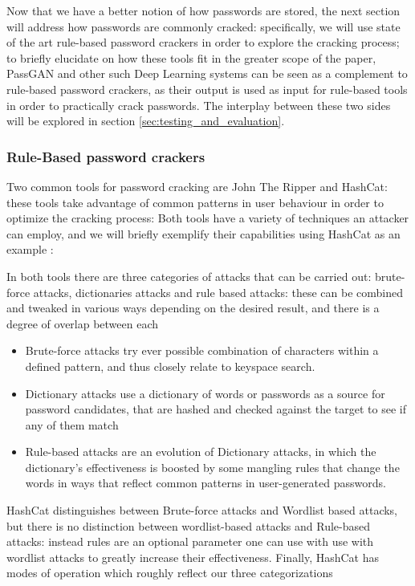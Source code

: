 Now that we have a better notion of how passwords are stored, the next section will address how passwords are commonly cracked: specifically, we will use state of the art rule-based password crackers in order to explore the cracking process; to briefly elucidate on how these tools fit in the greater scope of the paper, PassGAN and other such Deep Learning systems can be seen as a complement to rule-based password crackers, as their output is used as input for rule-based tools in order to practically crack passwords. The interplay between these two sides will be explored in section \ref{sec:testing_and_evaluation}.

\subsubsection{Rule-Based password crackers} \label{hash_and_jtr}

Two common tools for password cracking are John The Ripper and \break \mbox{HashCat}\cite{john,hash_cat}: these tools take advantage of common patterns in user behaviour in order to optimize the cracking process: Both tools have a variety of techniques an attacker can employ, and we will briefly exemplify their capabilities using HashCat as an example \cite{hash_cat_wiki}:

In both tools there are three categories of attacks that can be carried out: brute-force attacks, dictionaries attacks and rule based attacks: these can be combined and tweaked in various ways depending on the desired result, and there is a degree of overlap between each

\begin{itemize}
\item Brute-force attacks try ever possible combination of characters within a defined pattern, and thus closely relate to keyspace search. 
\item Dictionary attacks use a dictionary of words or passwords as a source for password candidates, that are hashed and checked against the target to see if any of them match
\item Rule-based attacks are an evolution of Dictionary attacks, in which the dictionary's effectiveness is boosted by some mangling rules that change the words in ways that reflect common patterns in user-generated passwords.
\end{itemize}

HashCat distinguishes between Brute-force attacks and Wordlist based attacks, but there is no distinction between wordlist-based attacks and Rule-based attacks: instead rules are an optional parameter one can use with use with wordlist attacks to greatly increase their effectiveness.
Finally, HashCat has modes of operation which roughly reflect our three categorizations 

